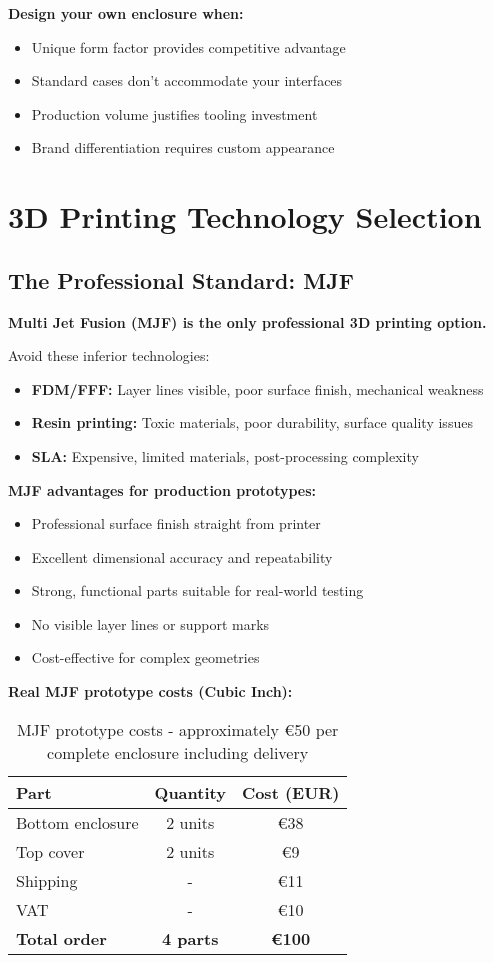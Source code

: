 \textbf{Design your own enclosure when:}
\begin{itemize}
\item Unique form factor provides competitive advantage
\item Standard cases don't accommodate your interfaces
\item Production volume justifies tooling investment
\item Brand differentiation requires custom appearance
\end{itemize}

\section{3D Printing Technology Selection}

\subsection{The Professional Standard: MJF}

\textbf{Multi Jet Fusion (MJF) is the only professional 3D printing option.}

Avoid these inferior technologies:
\begin{itemize}
\item \textbf{FDM/FFF:} Layer lines visible, poor surface finish, mechanical weakness
\item \textbf{Resin printing:} Toxic materials, poor durability, surface quality issues
\item \textbf{SLA:} Expensive, limited materials, post-processing complexity
\end{itemize}

\textbf{MJF advantages for production prototypes:}
\begin{itemize}
\item Professional surface finish straight from printer
\item Excellent dimensional accuracy and repeatability
\item Strong, functional parts suitable for real-world testing
\item No visible layer lines or support marks
\item Cost-effective for complex geometries
\end{itemize}

\textbf{Real MJF prototype costs (Cubic Inch):}

\begin{table}[h]
\centering
\begin{tabular}{|l|c|c|}
\hline
\textbf{Part} & \textbf{Quantity} & \textbf{Cost (EUR)} \\
\hline
Bottom enclosure & 2 units & €38 \\
Top cover & 2 units & €9 \\
Shipping & - & €11 \\
VAT & - & €10 \\
\hline
\textbf{Total order} & \textbf{4 parts} & \textbf{€100} \\
\hline
\end{tabular}
\caption{MJF prototype costs - approximately €50 per complete enclosure including delivery}
\end{table}

